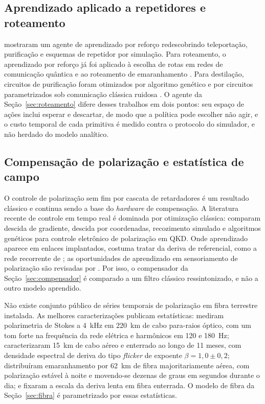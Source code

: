 \documentclass[12pt]{article}
\providecommand{\citeasnoun}[1]{\cite{#1}}
\begin{document}
\subsection{Aprendizado aplicado a repetidores e roteamento}

\citeasnoun{wallnofer2020} mostraram um agente de aprendizado por reforço
redescobrindo teleportação, purificação e esquemas de repetidor por simulação.
Para roteamento, o aprendizado por reforço já foi aplicado à escolha de rotas
em redes de comunicação quântica \cite{roik2024} e ao roteamento de
emaranhamento \cite{le2022}. Para destilação, circuitos de purificação foram
otimizados por algoritmo genético \cite{krastanov2019} e por circuitos
parametrizados sob comunicação clássica ruidosa \cite{chittoor2023}. O agente
da Seção~\ref{sec:roteamento} difere desses trabalhos em dois pontos: seu
espaço de ações inclui esperar e descartar, de modo que a política pode escolher
não agir, e o custo temporal de cada primitiva é medido contra o protocolo do
simulador, e não herdado do modelo analítico.

\subsection{Compensação de polarização e estatística de campo}
\label{sec:campo}

O controle de polarização sem fim por cascata de retardadores é um resultado
clássico \cite{noe1988} e continua sendo a base do \textit{hardware} de
compensação. A literatura recente de controle em tempo real é dominada por
otimização clássica: \citeasnoun{young2026} comparam descida de gradiente,
descida por coordenadas, recozimento simulado e algoritmos genéticos para
controle eletrônico de polarização em QKD. Onde aprendizado aparece em enlaces
implantados, costuma tratar da deriva de referencial, como a rede recorrente de
\citeasnoun{zhang2021}; as oportunidades de aprendizado em sensoriamento de
polarização são revisadas por \citeasnoun{rode2025}. Por isso, o compensador da
Seção~\ref{sec:compensador} é comparado a um filtro clássico ressintonizado, e
não a outro modelo aprendido.

Não existe conjunto público de séries temporais de polarização em fibra
terrestre instalada. As melhores caracterizações publicam estatísticas:
\citeasnoun{peterson2004} mediram polarimetria de Stokes a 4~kHz em 220~km de
cabo para-raios óptico, com um tom forte na frequência da rede elétrica e
harmônicos em 120 e 180~Hz; \citeasnoun{ramaswamy2026} caracterizaram 15~km de
cabo aéreo e enterrado ao longo de 11 meses, com densidade espectral de deriva
do tipo \textit{flicker} de expoente $\beta=1{,}0\pm0{,}2$;
\citeasnoun{shi2026} distribuíram emaranhamento por 62~km de fibra
majoritariamente aérea, com polarização estável à noite e movendo-se dezenas de
graus em segundos durante o dia; e \citeasnoun{czegledi2016} fixaram a escala da
deriva lenta em fibra enterrada. O modelo de fibra da Seção~\ref{sec:fibra} é
parametrizado por essas estatísticas.
\end{document}
